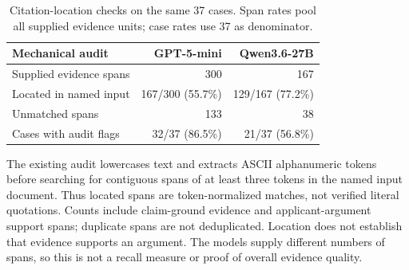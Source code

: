 \begin{table}[t]
\centering
\small
\setlength{\tabcolsep}{6pt}
\renewcommand{\arraystretch}{1.14}
\begin{tabular}{lrr}
\toprule
Mechanical audit & GPT-5-mini & Qwen3.6-27B \\
\midrule
Supplied evidence spans & 300 & 167 \\
Located in named input & 167/300 (55.7\%) & 129/167 (77.2\%) \\
Unmatched spans & 133 & 38 \\
Cases with audit flags & 32/37 (86.5\%) & 21/37 (56.8\%) \\
\bottomrule
\end{tabular}
\caption{Citation-location checks on the same 37 cases. Span rates pool all supplied evidence units; case rates use 37 as denominator.}
\label{tab:cgen-t05}
\vspace{2pt}
\begin{minipage}{\textwidth}
\footnotesize The existing audit lowercases text and extracts ASCII alphanumeric tokens before searching for contiguous spans of at least three tokens in the named input document. Thus located spans are token-normalized matches, not verified literal quotations. Counts include claim-ground evidence and applicant-argument support spans; duplicate spans are not deduplicated. Location does not establish that evidence supports an argument. The models supply different numbers of spans, so this is not a recall measure or proof of overall evidence quality.
\end{minipage}
\end{table}
